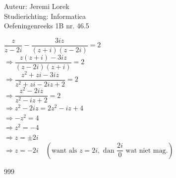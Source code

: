 \documentclass[a4paper]{article}
\begin{document}
  
\noindent \large Auteur: Jeremi Lorek\\
\noindent \large Studierichting: Informatica\\
\noindent \large Oefeningenreeks 1B nr. 46.5\\

\medskip
\normalsize

$\dfrac{z}{z-2i} - \dfrac{3iz}{(z+i)(z-2i)} = 2$  \\

$\Rightarrow \dfrac{z(z+i) - 3iz}{(z-2i)(z+i)} = 2$  \\

$\Rightarrow \dfrac{z^2 + zi - 3iz}{z^2 + zi - 2iz + 2} = 2$  \\

$\Rightarrow \dfrac{z^2 - 2iz}{z^2 - iz + 2} = 2$  \\

$\Rightarrow z^2 - 2iz = 2z^2 - iz + 4$  \\

$\Rightarrow -z^2 = 4$ \\

$\Rightarrow z^2 = -4 $ \\

$\Rightarrow z = \pm 2i$  \\

$\Rightarrow z = -2i \quad (\text{want als } z=2i, \text{ dan } \dfrac{2i}{0} \text{ wat niet mag.})$ \\



\begin{thebibliography}{999}
\end{thebibliography}
\end{document}
